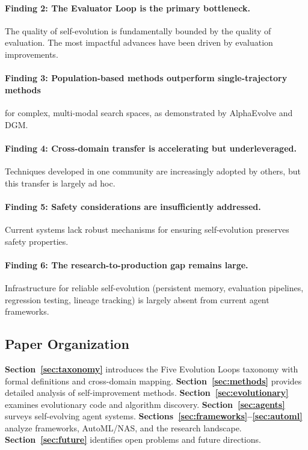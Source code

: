 \paragraph{Finding 2: The Evaluator Loop is the primary bottleneck.} The quality of self-evolution is fundamentally bounded by the quality of evaluation. The most impactful advances have been driven by evaluation improvements.

\paragraph{Finding 3: Population-based methods outperform single-trajectory methods} for complex, multi-modal search spaces, as demonstrated by AlphaEvolve and DGM.

\paragraph{Finding 4: Cross-domain transfer is accelerating but underleveraged.} Techniques developed in one community are increasingly adopted by others, but this transfer is largely ad hoc.

\paragraph{Finding 5: Safety considerations are insufficiently addressed.} Current systems lack robust mechanisms for ensuring self-evolution preserves safety properties.

\paragraph{Finding 6: The research-to-production gap remains large.} Infrastructure for reliable self-evolution (persistent memory, evaluation pipelines, regression testing, lineage tracking) is largely absent from current agent frameworks.


\subsection{Paper Organization}
\label{sec:organization}

\textbf{Section~\ref{sec:taxonomy}} introduces the Five Evolution Loops taxonomy with formal definitions and cross-domain mapping. \textbf{Section~\ref{sec:methods}} provides detailed analysis of self-improvement methods. \textbf{Section~\ref{sec:evolutionary}} examines evolutionary code and algorithm discovery. \textbf{Section~\ref{sec:agents}} surveys self-evolving agent systems. \textbf{Sections~\ref{sec:frameworks}--\ref{sec:automl}} analyze frameworks, AutoML/NAS, and the research landscape. \textbf{Section~\ref{sec:future}} identifies open problems and future directions.

